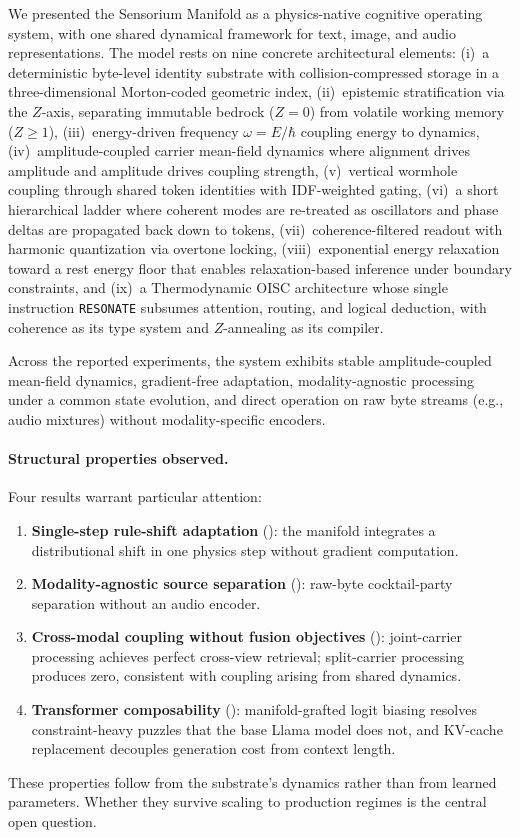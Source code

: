 \documentclass[11pt,a4paper]{article}
\begin{document}
We presented the Sensorium Manifold as a physics-native cognitive operating system, with one shared dynamical framework for text, image, and audio representations. The model rests on nine concrete architectural elements: (i)~a deterministic byte-level identity substrate with collision-compressed storage in a three-dimensional Morton-coded geometric index, (ii)~epistemic stratification via the $Z$-axis, separating immutable bedrock ($Z\!=\!0$) from volatile working memory ($Z \ge 1$), (iii)~energy-driven frequency $\omega=E/\hbar$ coupling energy to dynamics, (iv)~amplitude-coupled carrier mean-field dynamics where alignment drives amplitude and amplitude drives coupling strength, (v)~vertical wormhole coupling through shared token identities with IDF-weighted gating, (vi)~a short hierarchical ladder where coherent modes are re-treated as oscillators and phase deltas are propagated back down to tokens, (vii)~coherence-filtered readout with harmonic quantization via overtone locking, (viii)~exponential energy relaxation toward a rest energy floor that enables relaxation-based inference under boundary constraints, and (ix)~a Thermodynamic OISC architecture whose single instruction \texttt{RESONATE} subsumes attention, routing, and logical deduction, with coherence as its type system and $Z$-annealing as its compiler.

Across the reported experiments, the system exhibits stable amplitude-coupled mean-field dynamics, gradient-free adaptation, modality-agnostic processing under a common state evolution, and direct operation on raw byte streams (e.g., audio mixtures) without modality-specific encoders.

\paragraph{Structural properties observed.}
Four results warrant particular attention:
\begin{enumerate}[nosep]
  \item \textbf{Single-step rule-shift adaptation} (): the manifold integrates a distributional shift in one physics step without gradient computation.
  \item \textbf{Modality-agnostic source separation} (): raw-byte cocktail-party separation without an audio encoder.
  \item \textbf{Cross-modal coupling without fusion objectives} (): joint-carrier processing achieves perfect cross-view retrieval; split-carrier processing produces zero, consistent with coupling arising from shared dynamics.
  \item \textbf{Transformer composability} (): manifold-grafted logit biasing resolves constraint-heavy puzzles that the base Llama model does not, and KV-cache replacement decouples generation cost from context length.
\end{enumerate}
These properties follow from the substrate's dynamics rather than from learned parameters. Whether they survive scaling to production regimes is the central open question.
\end{document}
